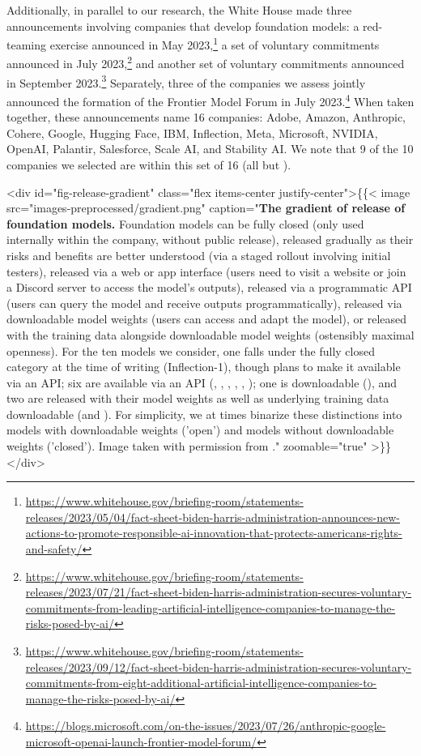 \documentclass[screen, authorversion, acmsmall]{acmart}
\begin{document}
Additionally, in parallel to our research, the White House made three announcements involving companies that develop foundation models: a red-teaming exercise announced in May 2023,\footnote{\url{https://www.whitehouse.gov/briefing-room/statements-releases/2023/05/04/fact-sheet-biden-harris-administration-announces-new-actions-to-promote-responsible-ai-innovation-that-protects-americans-rights-and-safety/}} a set of voluntary commitments announced in July 2023,\footnote{\url{https://www.whitehouse.gov/briefing-room/statements-releases/2023/07/21/fact-sheet-biden-harris-administration-secures-voluntary-commitments-from-leading-artificial-intelligence-companies-to-manage-the-risks-posed-by-ai/}} and another set of voluntary commitments announced in September 2023.\footnote{\url{https://www.whitehouse.gov/briefing-room/statements-releases/2023/09/12/fact-sheet-biden-harris-administration-secures-voluntary-commitments-from-eight-additional-artificial-intelligence-companies-to-manage-the-risks-posed-by-ai/}}
Separately, three of the companies we assess jointly announced the formation of the Frontier Model Forum in July 2023.\footnote{\url{https://blogs.microsoft.com/on-the-issues/2023/07/26/anthropic-google-microsoft-openai-launch-frontier-model-forum/}} 
When taken together, these announcements name 16 companies: Adobe, Amazon, Anthropic, Cohere, Google, Hugging Face, IBM, Inflection, Meta, Microsoft, NVIDIA, OpenAI, Palantir, Salesforce, Scale AI, and Stability AI.
We note that 9 of the 10 companies we selected are within this set of 16 (all but \aitwentyone).


<div id="fig-release-gradient" class="flex items-center justify-center">\{\{< image src="images-preprocessed/gradient.png" caption="\textbf{The gradient of release of foundation models.}  Foundation models can be fully closed (\eg only used internally within the company, without public release),  released gradually as their risks and benefits are better understood (\eg via a staged rollout involving initial testers),  released via a web or app interface (\eg users need to visit a website or join a Discord server to access the model's outputs),  released via a programmatic API (\eg users can query the model and receive outputs programmatically),  released via downloadable model weights (\eg users can access and adapt the model),  or released with the training data alongside downloadable model weights (\ie ostensibly maximal openness).  For the ten models we consider, one falls under the fully closed category at the time of writing (Inflection-1), though \inflection plans to make it available via an API; six are available via an API (\gptfour, \claude, \palm, \jurassic, \command, \titan); one is downloadable (\llama), and two are released with their model weights as well as underlying training data downloadable (\stablediffusion and \bloomz).  For simplicity, we at times binarize these distinctions into models with downloadable weights ('open') and models without downloadable weights ('closed'). Image taken with permission from \citet{solaiman2023gradient}." zoomable="true" >\}\}</div>
\end{document}
